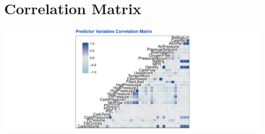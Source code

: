 \documentclass[]{report}
\begin{document}
\hypertarget{correlation-matrix}{%
\section{Correlation Matrix}\label{correlation-matrix}}

\begin{center}\includegraphics{Proj2-JM_files/figure-latex/unnamed-chunk-11-1} \end{center}
\end{document}
